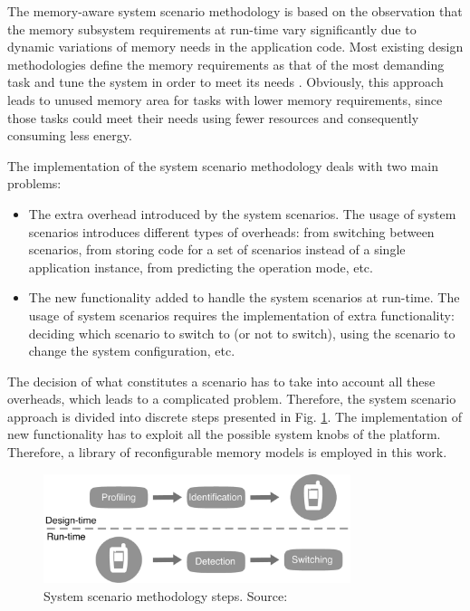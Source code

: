 The memory-aware system scenario methodology is based on the observation that the memory subsystem requirements at run-time vary significantly due to dynamic variations of memory needs in the application code. 
Most existing design methodologies define the memory requirements as that of the most demanding task and tune the system in order to meet its needs \cite{tcm}. 
Obviously, this approach leads to unused memory area for tasks with lower memory requirements, since those tasks could meet their needs using fewer resources and consequently consuming less energy. 

The implementation of the system scenario methodology deals with two main problems: 
\begin{itemize}
 \item The extra overhead introduced by the system scenarios. The usage of system scenarios introduces different types of overheads: from switching between scenarios, from storing code for a set of scenarios instead of a single application instance, from predicting the operation mode, etc.
 \item The new functionality added to handle the system scenarios at run-time. The usage of system scenarios requires the implementation of extra functionality: deciding which scenario to switch to (or not to switch), using the scenario to change the system configuration, etc.
\end{itemize}
 
 The decision of what constitutes a scenario has to take into account all these overheads, which leads to a complicated problem. 
 Therefore, the system scenario approach is divided into discrete steps presented in Fig. \ref{fig:overview}.
 The implementation of new functionality has to exploit all the possible system knobs of the platform.
 Therefore, a library of reconfigurable memory models is employed in this work.

\begin{figure}
\centering
	\includegraphics[width=0.8\textwidth]{Images/overview.pdf}
	\caption{System scenario methodology steps. Source: \cite{GheoThesis} }
	\label{fig:overview}
\end{figure}

